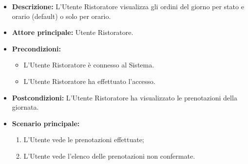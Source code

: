 \label{usecase:Visualizzazione dell'homepage del Ristoratore}
\begin{itemize}

\item \textbf{Descrizione:} L'Utente Ristoratore visualizza gli ordini del giorno per stato e orario (default) o solo per orario.

\item \textbf{Attore principale:} Utente Ristoratore.

\item \textbf{Precondizioni:}
\begin{itemize} \item L'Utente Ristoratore è connesso al Sistema.
    \item L'Utente Ristoratore ha effettuato l'accesso.
\end{itemize}

\item \textbf{Postcondizioni:} L'Utente Ristoratore ha visualizzato le prenotazioni della giornata.

\item \textbf{Scenario principale:}
    \begin{enumerate}
        \item L'Utente vede le prenotazioni effettuate;
        \item L'Utente vede l'elenco delle prenotazioni non confermate.
    \end{enumerate}
\end{itemize}